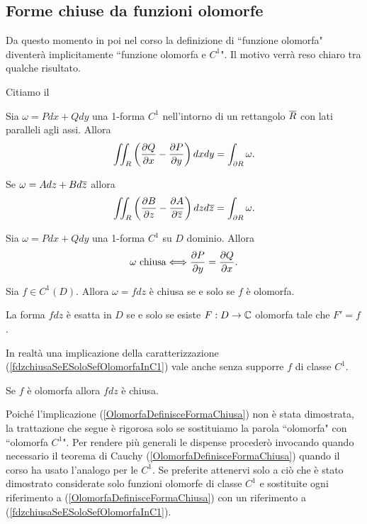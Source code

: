 \begin{multicols*}{2}
\subsection{Forme chiuse da funzioni olomorfe}
Da questo momento in poi nel corso la definizione di ``funzione olomorfa" diventer\`a implicitamente ``funzione olomorfa e $C^1$". Il motivo verr\`a reso chiaro tra qualche risultato.
\bigskip

\noindent Citiamo il
\begin{theorem}\label{TeoremaGaussGreen}
Sia $\omega=Pdx+Qdy$ una 1-forma $C^1$ nell'intorno di un rettangolo $\ol R$ con lati paralleli agli assi. Allora
\[\iint_R\pa{\pdp Q-\pdp[y]P}dxdy=\int_{\partial R}\omega.\]
\end{theorem}
\begin{remark}
Se $\omega=Adz+Bd\ol z$ allora
\[\iint_R\pa{\pdp[z] B-\pdp[\ol z]A}dzd\ol z=\int_{\partial R}\omega.\]
\end{remark}
\begin{theorem}\label{CaratterizzazioneFormeChiuseC1TramiteDerivateParziali}
Sia $\omega=Pdx+Qdy$ una 1-forma $C^1$ su $D$ dominio. Allora \[\omega  \text{ chiusa} \coimplies \pdp[y]P=\pdp Q.\]
\end{theorem}

\begin{corollary}\label{fdzchiusaSeESoloSefOlomorfaInC1}
Sia $f\in C^1(D)$. Allora $\omega=fdz$ \`e chiusa se e solo se $f$ \`e olomorfa.
\end{corollary}

\begin{corollary}
La forma $fdz$ \`e esatta in $D$ se e solo se esiste $F:D\to\C$ olomorfa tale che $F'=f$.
\end{corollary}

\noindent In realt\`a una implicazione della caratterizzazione (\ref{fdzchiusaSeESoloSefOlomorfaInC1}) vale anche senza supporre $f$ di classe $C^1$.

\begin{theorem}[Cauchy]\label{OlomorfaDefinisceFormaChiusa}
Se $f$ \`e olomorfa allora $fdz$ \`e chiusa.
\end{theorem}

\noindent Poich\'e l'implicazione (\ref{OlomorfaDefinisceFormaChiusa}) non \`e stata dimostrata, la trattazione che segue \`e rigorosa solo se sostituiamo la parola ``olomorfa" con ``olomorfa $C^1$". Per rendere pi\`u generali le dispense proceder\`o invocando quando necessario il teorema di Cauchy (\ref{OlomorfaDefinisceFormaChiusa}) quando il corso ha usato l'analogo per le $C^1$. Se preferite attenervi solo a ci\`o che \`e stato dimostrato considerate solo funzioni olomorfe di classe $C^1$ e sostituite ogni riferimento a (\ref{OlomorfaDefinisceFormaChiusa}) con un riferimento a (\ref{fdzchiusaSeESoloSefOlomorfaInC1}).
\bigskip


\end{multicols*}
